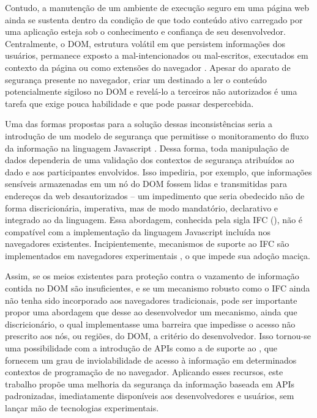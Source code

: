 Contudo, a manutenção de um ambiente de execução seguro em uma página web ainda se sustenta dentro da condição de que todo conteúdo ativo carregado por uma aplicação esteja sob o conhecimento e confiança de seu desenvolvedor. Centralmente, o DOM, estrutura volátil em que persistem informações dos usuários, permanece exposto a {\scripts} mal-intencionados ou mal-escritos, executados em contexto da página ou como extensões do navegador \cite{Heule2015_Most_Dangerous_Code}. Apesar do aparato de segurança presente no navegador, criar um {\script} destinado a ler o conteúdo potencialmente sigiloso no DOM e revelá-lo a terceiros não autorizados é uma tarefa que exige pouca habilidade e que pode passar despercebida.

Uma das formas propostas para a solução dessas inconsistências seria a introdução de um modelo de segurança que permitisse o monitoramento do fluxo da informação na linguagem Javascript \cite[p.3]{Heule2015_IFC_Inside}. Dessa forma, toda manipulação de dados dependeria de uma validação dos contextos de segurança atribuídos ao dado e aos participantes envolvidos. Isso impediria, por exemplo, que informações sensíveis armazenadas em um nó do DOM fossem lidas e transmitidas para endereços da web desautorizados -- um impedimento que seria obedecido não de forma discricionária, imperativa, mas de modo mandatório, declarativo e integrado ao  da linguagem. Essa abordagem, conhecida pela sigla IFC (), não é compatível com a implementação da linguagem Javascript incluída nos navegadores existentes. Incipientemente, mecanismos de suporte ao IFC são implementados em navegadores experimentais \cite{Hedin2014, Bichhawat2014}, o que impede sua adoção maciça.

Assim, se os meios existentes para proteção contra o vazamento de informação contida no DOM são insuficientes, e se um mecanismo robusto como o IFC ainda não tenha sido incorporado aos navegadores tradicionais, pode ser importante propor uma abordagem que desse ao desenvolvedor um mecanismo, ainda que discricionário, o qual implementasse uma barreira que impedisse o acesso não prescrito aos nós, ou regiões, do DOM, a critério do desenvolvedor. Isso tornou-se uma possibilidade com a introdução de APIs como a de suporte ao  \cite{W3C:ShadowDOM}, que fornecem um grau de inviolabilidade de acesso à informação em determinados contextos de programação de \scripts{} no navegador. Aplicando esses recursos, este trabalho propõe uma melhoria da segurança da informação baseada em APIs padronizadas, imediatamente disponíveis aos desenvolvedores e usuários, sem lançar mão de tecnologias experimentais.